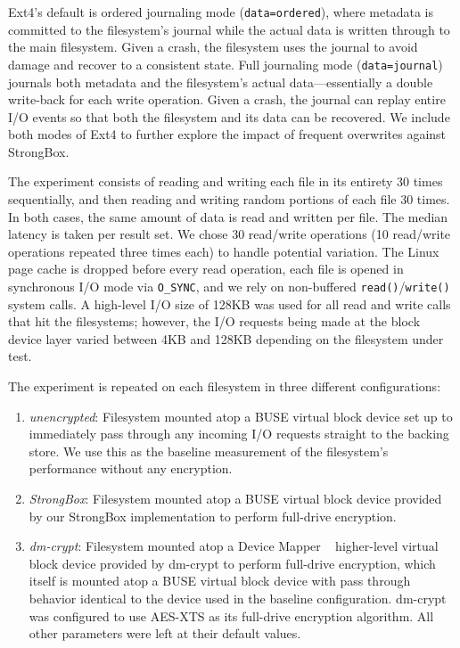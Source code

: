 Ext4's default is ordered journaling mode (\texttt{data=ordered}),
where metadata is committed to the filesystem's journal while the
actual data is written through to the main filesystem. Given a crash,
the filesystem uses the journal to avoid damage and recover to a
consistent state. Full journaling mode (\texttt{data=journal})
journals both metadata and the filesystem's actual data---essentially
a double write-back for each write operation. Given a crash, the
journal can replay entire I/O events so that both the filesystem and
its data can be recovered. We include both modes of Ext4 to further
explore the impact of frequent overwrites against StrongBox.

The experiment consists of reading and writing each file in its
entirety 30 times sequentially, and then reading and writing random
portions of each file 30 times. In both cases, the same amount of data
is read and written per file. The median latency is taken per result
set. We chose 30 read/write operations (10 read/write operations
repeated three times each) to handle potential variation. The Linux
page cache is dropped before every read operation, each file is
opened in synchronous I/O mode via \texttt{O\_SYNC}, and we rely on
non-buffered \texttt{read()}/\texttt{write()} system calls. A
high-level I/O size of 128KB was used for all read and write calls
that hit the filesystems; however, the I/O requests being made at the
block device layer varied between 4KB and 128KB depending on the
filesystem under test.

The experiment is repeated on each filesystem in three different
configurations:
\begin{enumerate}
\item \textit{unencrypted}: Filesystem mounted atop a BUSE virtual block
  device set up to immediately pass through any incoming I/O requests straight
  to the backing store. We use this as the baseline measurement of the
  filesystem's performance without any encryption.
\item \textit{StrongBox}: Filesystem mounted atop a BUSE virtual block
  device provided by our StrongBox implementation to perform full-drive
  encryption.
\item \textit{dm-crypt}: Filesystem mounted atop a Device Mapper
 ~\cite{LinuxDeviceMapper} higher-level virtual block device provided by
  dm-crypt to perform full-drive encryption, which itself is mounted atop a
  BUSE virtual block device with pass through behavior identical to the device
  used in the baseline configuration. dm-crypt was configured to use AES-XTS as
  its full-drive encryption algorithm. All other parameters were left at their
  default values.
\end{enumerate}

